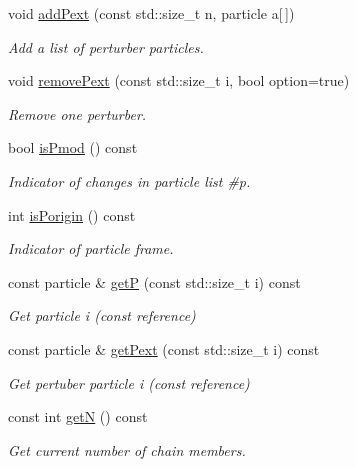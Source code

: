 \begin{DoxyCompactItemize}
void \hyperlink{classARC_1_1chain_a6b5cf35f505262d9d2326abb2904d91d}{add\+Pext} (const std\+::size\+\_\+t n, particle a\mbox{[}$\,$\mbox{]})
\begin{DoxyCompactList}\small\item\em Add a list of perturber particles. \end{DoxyCompactList}\item 
void \hyperlink{classARC_1_1chain_a7d563413beb44795b8ecd1348a2d2305}{remove\+Pext} (const std\+::size\+\_\+t i, bool option=true)
\begin{DoxyCompactList}\small\item\em Remove one perturber. \end{DoxyCompactList}\item 
bool \hyperlink{classARC_1_1chain_a29ff9707fe94a554966c885d9bafa819}{is\+Pmod} () const
\begin{DoxyCompactList}\small\item\em Indicator of changes in particle list \#p. \end{DoxyCompactList}\item 
int \hyperlink{classARC_1_1chain_a7de218a1874b150ee44a05aa9d7b7b6d}{is\+Porigin} () const
\begin{DoxyCompactList}\small\item\em Indicator of particle frame. \end{DoxyCompactList}\item 
const particle \& \hyperlink{classARC_1_1chain_ad8bacf5ad6ea0bb31bdb457e4c626701}{getP} (const std\+::size\+\_\+t i) const
\begin{DoxyCompactList}\small\item\em Get particle i (const reference) \end{DoxyCompactList}\item 
const particle \& \hyperlink{classARC_1_1chain_a992795e009faf43b59fc338350ae210c}{get\+Pext} (const std\+::size\+\_\+t i) const
\begin{DoxyCompactList}\small\item\em Get pertuber particle i (const reference) \end{DoxyCompactList}\item 
const int \hyperlink{classARC_1_1chain_a582ad9ae8003400e06bba908d70d60d9}{getN} () const
\begin{DoxyCompactList}\small\item\em Get current number of chain members. \end{DoxyCompactList}\item 

\end{DoxyCompactItemize}
